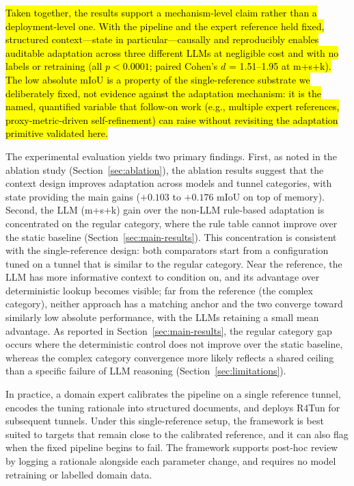 \documentclass[a4paper,fleqn]{cas-dc}
\begin{document}
{\hl{Taken together, the results support a mechanism-level claim rather than a deployment-level one. With the pipeline and the expert reference held fixed, structured context---state in particular---causally and reproducibly enables auditable adaptation across three different LLMs at negligible cost and with no labels or retraining (all \mbox{$p < 0.0001$}; paired Cohen's \mbox{$d$} = 1.51--1.95 at m+s+k). The low absolute mIoU is a property of the single-reference substrate we deliberately fixed, not evidence against the adaptation mechanism: it is the named, quantified variable that follow-on work (e.g., multiple expert references, proxy-metric-driven self-refinement) can raise without revisiting the adaptation primitive validated here.}

The experimental evaluation yields two primary findings. First, as noted in the ablation study (Section~\ref{sec:ablation}), the ablation results suggest that the context design improves adaptation across models and tunnel categories, with state providing the main gains ($+0.103$ to $+0.176$ mIoU on top of memory). Second, the LLM (m+s+k) gain over the non-LLM rule-based adaptation is concentrated on the regular category, where the rule table cannot improve over the static baseline (Section~\ref{sec:main-results}). This concentration is consistent with the single-reference design: both comparators start from a configuration tuned on a tunnel that is similar to the regular category. Near the reference, the LLM has more informative context to condition on, and its advantage over deterministic lookup becomes visible; far from the reference (the complex category), neither approach has a matching anchor and the two converge toward similarly low absolute performance, with the LLMs retaining a small mean advantage. As reported in Section~\ref{sec:main-results}, the regular category gap occurs where the deterministic control does not improve over the static baseline, whereas the complex category convergence more likely reflects a shared ceiling than a specific failure of LLM reasoning (Section~\ref{sec:limitations}).


In practice, a domain expert calibrates the pipeline on a single reference tunnel, encodes the tuning rationale into structured documents, and deploys R4Tun for subsequent tunnels. Under this single-reference setup, the framework is best suited to targets that remain close to the calibrated reference, and it can also flag when the fixed pipeline begins to fail. The framework supports post-hoc review by logging a rationale alongside each parameter change, and requires no model retraining or labelled domain data.


}
\end{document}
